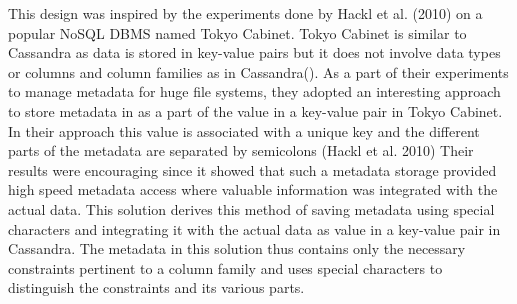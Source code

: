 This design was inspired by the experiments done by Hackl et al.   (2010) on a
popular \ac{NoSQL} \ac{DBMS} named Tokyo Cabinet.  Tokyo Cabinet is similar to
Cassandra as data is stored in key-value pairs but it does not involve data
types or columns and column families as in Cassandra(). 
As a part of their experiments to manage metadata for huge file systems,  they
adopted an interesting approach to store metadata in as a part of the value in a
key-value pair in Tokyo Cabinet.  In their approach this value  is associated
with a unique key and the different parts of the metadata are separated by
semicolons (Hackl et al.   2010)
Their results were encouraging since it showed that such a metadata
storage provided high speed metadata access where valuable information was 
integrated with the actual data.  This solution derives this method of saving
metadata using special characters and integrating it with the actual data as
value in a key-value pair in Cassandra.  The metadata in this solution thus
contains only the necessary constraints pertinent to a column family and uses
special characters to distinguish the constraints and its various parts. 













